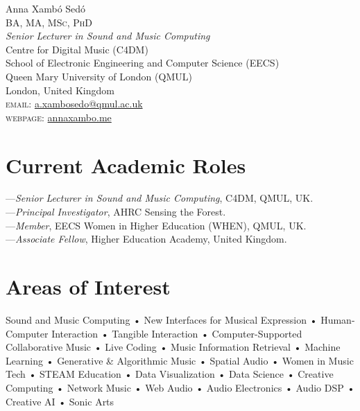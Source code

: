 \documentclass[10pt, a4paper]{article}
\begin{document}
{\Huge Anna Xambó Sedó}\\[0.1cm]
\textsc{BA, MA, MSc, PhD}\\[0.9cm]
\emph{Senior Lecturer in Sound and Music Computing}\\
Centre for Digital Music (C4DM)\\
School of Electronic Engineering and Computer Science (EECS)\\
Queen Mary University of London (QMUL)\\
London, United Kingdom\\[.2cm]
\textsc{email}: \href{mailto:a.xambosedo@qmul.ac.uk}{a.xambosedo@qmul.ac.uk}\\
\textsc{webpage}: \href{http://annaxambo.me/}{annaxambo.me}

\section*{Current Academic Roles}
---\emph{Senior Lecturer in Sound and Music Computing}, C4DM, QMUL, UK.\\
---\emph{Principal Investigator}, AHRC Sensing the Forest.\\
---\emph{Member}, EECS Women in Higher Education (WHEN), QMUL, UK.\\
---\emph{Associate Fellow}, Higher Education Academy, United Kingdom.
\section*{Areas of Interest}
Sound and Music Computing • New Interfaces for Musical Expression • Human-Computer Interaction • Tangible Interaction • Computer-Supported Collaborative Music • Live Coding • Music Information Retrieval • Machine Learning • Generative \& Algorithmic Music • Spatial Audio • Women in Music Tech • STEAM Education • Data Visualization • Data Science • Creative Computing • Network Music • Web Audio • Audio Electronics • Audio DSP • Creative AI • Sonic Arts
\end{document}
